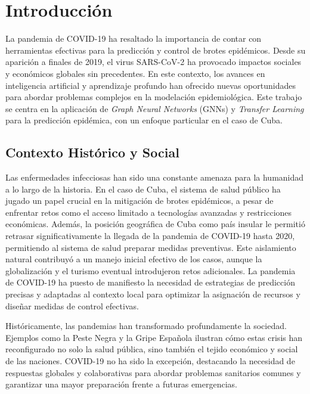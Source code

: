 \chapter*{Introducción}\label{chapter:introduction}

La pandemia de COVID-19 ha resaltado la importancia de contar con herramientas efectivas para la predicción y control de brotes epidémicos. Desde su aparición a finales de 2019, el virus SARS-CoV-2 ha provocado impactos sociales y económicos globales sin precedentes. En este contexto, los avances en inteligencia artificial y aprendizaje profundo han ofrecido nuevas oportunidades para abordar problemas complejos en la modelación epidemiológica. Este trabajo se centra en la aplicación de \textit{Graph Neural Networks} (GNNs) y \textit{Transfer Learning} para la predicción epidémica, con un enfoque particular en el caso de Cuba.

\section*{Contexto Histórico y Social}
Las enfermedades infecciosas han sido una constante amenaza para la humanidad a lo largo de la historia. En el caso de Cuba, el sistema de salud público ha jugado un papel crucial en la mitigación de brotes epidémicos, a pesar de enfrentar retos como el acceso limitado a tecnologías avanzadas y restricciones económicas. Además, la posición geográfica de Cuba como país insular le permitió retrasar significativamente la llegada de la pandemia de COVID-19 hasta 2020, permitiendo al sistema de salud preparar medidas preventivas. Este aislamiento natural contribuyó a un manejo inicial efectivo de los casos, aunque la globalización y el turismo eventual introdujeron retos adicionales. La pandemia de COVID-19 ha puesto de manifiesto la necesidad de estrategias de predicción precisas y adaptadas al contexto local para optimizar la asignación de recursos y diseñar medidas de control efectivas.

Históricamente, las pandemias han transformado profundamente la sociedad. Ejemplos como la Peste Negra y la Gripe Española ilustran cómo estas crisis han reconfigurado no solo la salud pública, sino también el tejido económico y social de las naciones. COVID-19 no ha sido la excepción, destacando la necesidad de respuestas globales y colaborativas para abordar problemas sanitarios comunes y garantizar una mayor preparación frente a futuras emergencias.

